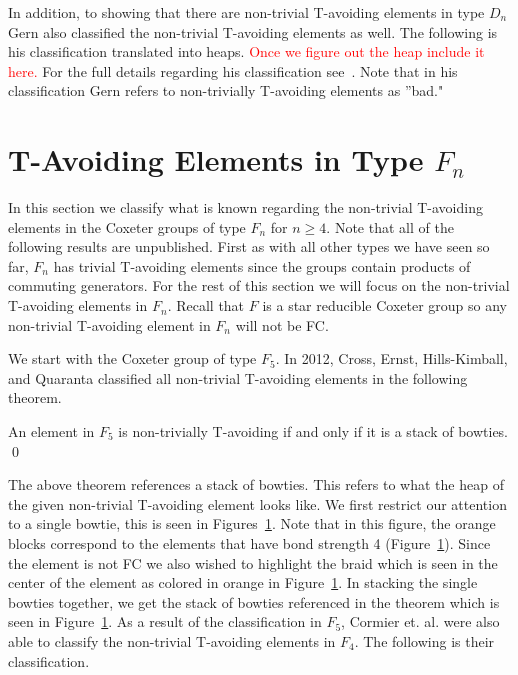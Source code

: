 In addition, to showing that there are non-trivial T-avoiding elements in type $D_n$ Gern also classified the non-trivial T-avoiding elements as well. The following is his classification translated into heaps. \textcolor{red}{Once we figure out the heap include it here.} For the full details regarding his classification see~\cite{Gern2013a}. Note that in his classification Gern  refers to non-trivially T-avoiding elements as ''bad."


\section{T-Avoiding Elements in Type $F_n$}

In this section we classify what is known regarding the non-trivial T-avoiding elements in the Coxeter groups of type $F_n$ for $n \geq 4$. Note that all of the following results are unpublished. First as with all other types we have seen so far, $F_n$ has trivial T-avoiding elements since the groups contain products of commuting generators. For the rest of this section we will focus on the non-trivial T-avoiding elements in $F_n$. Recall that $F$ is a star reducible Coxeter group so any non-trivial T-avoiding element in $F_n$ will not be FC.

We start with the Coxeter group of type $F_5$. In 2012, Cross, Ernst, Hills-Kimball, and Quaranta classified all non-trivial T-avoiding elements in the following theorem.

\begin{theorem}
An element in $F_5$ is non-trivially T-avoiding if and only if it is a stack of bowties. \qed	
\end{theorem}

The above theorem references a stack of bowties. This refers to what the heap of the given non-trivial T-avoiding element looks like. We first restrict our attention to a single bowtie, this is seen in Figures~\ref{}. Note that in this figure, the orange blocks correspond to the elements that have bond strength 4 (Figure~\ref{}). Since the element is not FC we also wished to highlight the braid which is seen in the center of the element as colored in orange in Figure~\ref{}. In stacking the single bowties together, we get the stack of bowties referenced in the theorem which is seen in Figure~\ref{}. As a result of the classification in $F_5$, Cormier et. al. were also able to classify the non-trivial T-avoiding elements in $F_4$. The following is their classification.

